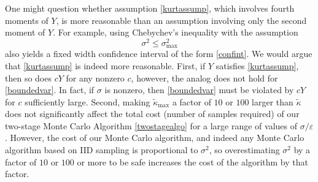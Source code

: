 \documentclass[graybox]{svmult}
\newcommand{\tkappa}{\tilde{\kappa}}
\begin{document}
One might question whether assumption \eqref{kurtassump}, which involves fourth
moments of $Y$, is more reasonable than an assumption involving only the second moment of $Y$.  For example, using Chebychev's inequality with the assumption 
\begin{equation} \label{boundedvar}
\sigma^2 \le \sigma^2_{\max}
\end{equation}
also yields a fixed width confidence interval of the form \eqref{confint}.  We would argue that \eqref{kurtassump} is indeed more reasonable.  First, if $Y$ satisfies \eqref{kurtassump}, then so does $cY$ for any nonzero $c$, however, the analog does not hold for \eqref{boundedvar}.  In fact, if $\sigma$ is nonzero, then \eqref{boundedvar} must be violated by $cY$ for $c$ sufficiently large.  Second, making $\tkappa_{\max}$ a factor of $10$ or $100$ larger than $\tkappa$ does not significantly affect the total cost (number of samples required) of our two-stage Monte Carlo Algorithm \ref{twostagealgo} for a large range of values of $\sigma/\varepsilon$.  However, the cost of our Monte Carlo algorithm, and indeed any Monte Carlo algorithm based on IID sampling is proportional to $\sigma^2$, so overestimating $\sigma^2$ by a factor of $10$ or $100$ or more to be safe increases the cost of the algorithm by that factor. 
\end{document}
